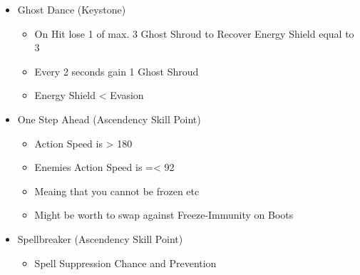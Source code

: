 \begin{itemize}
	\item Ghost Dance (Keystone)
	\begin{itemize}
		\item On Hit lose 1 of max. 3 Ghost Shroud to Recover Energy Shield equal to 3%
		\item Every 2 seconds gain 1 Ghost Shroud
		\item Energy Shield < Evasion
	\end{itemize}
	\item One Step Ahead (Ascendency Skill Point)
	\begin{itemize}
		\item Action Speed is > 180%
		\item Enemies Action Speed is =< 92 %
		\item Meaing that you cannot be frozen etc
		\item Might be worth to swap against Freeze-Immunity on Boots
	\end{itemize}
	\item Spellbreaker (Ascendency Skill Point)
	\begin{itemize}
		\item Spell Suppression Chance and Prevention
	\end{itemize}
\end{itemize}